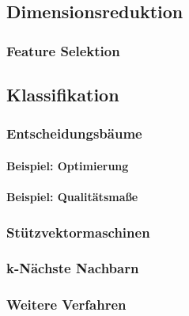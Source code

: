         \subsection{Dimensionsreduktion} %

            \subsubsection{Feature Selektion} %

        \subsection{Klassifikation} %

            \subsubsection{Entscheidungsbäume} %

                \paragraph{Beispiel: Optimierung} %

                \paragraph{Beispiel: Qualitätsmaße} %

            \subsubsection{Stützvektormaschinen} %

            \subsubsection{k-Nächste Nachbarn} %

            \subsubsection{Weitere Verfahren} %

